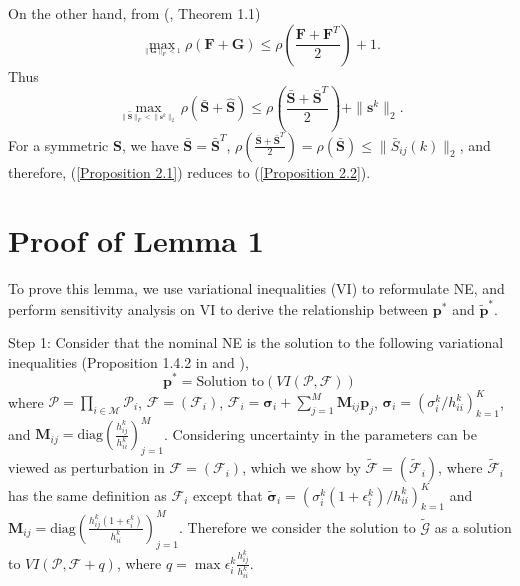 \documentclass[peerreview,onecolumn,11pt,draftclsnofoot]{IEEEtran}\usepackage{amsmath}\usepackage{amsfonts}\usepackage{epsfig}\usepackage{amssymb}\usepackage{graphicx}\usepackage{amssymb,amsmath}\usepackage{cite}\usepackage{color,soul}\newcommand\T{\rule{0pt}{3.1ex}}
\begin{document}
On the other hand, from (\!\!\cite{Matrixanalysis1}, Theorem 1.1)
\begin{equation}\label{6.Proof of Proposition 2}
 \max_{_{\|\textbf{G}\|_{F} < 1}} \rho (\textbf{F}+\textbf{G})\leq  \rho
 (\frac{\textbf{F}+\textbf{F}^{T}}{2})+1. \nonumber
\end{equation}
Thus
\begin{equation}\label{7.Proof of Proposition 2}
 \max_{_{\|\hat{\textbf{S}}\|_{F} < \|\mathbf{s}^{k}\|_2}} \rho (\bar{\textbf{S}}+\hat{\textbf{S}})\leq  \rho
 (\frac{\bar{\textbf{S}}+\bar{\textbf{S}}^{T}}{2})+\|\mathbf{s}^{k}\|_2. \nonumber
\end{equation}
For a symmetric $\textbf{S}$, we have $\bar{\textbf{S}}=\bar{\textbf{S}}^{T}$,
$\rho(\frac{\bar{\textbf{S}}+\bar{\textbf{S}}^{T}}{2})=\rho(\bar{\textbf{S}})\leq\|\bar{S}_{ij}(k)\|_{2}$,
and therefore, (\ref{Proposition 2.1}) reduces to (\ref{Proposition 2.2}).

\section{Proof of Lemma 1}
To prove this lemma, we use variational inequalities (VI) to reformulate NE, and perform sensitivity analysis on VI to derive the relationship between $\mathbf{p}^*$ and $\widetilde{\mathbf{p}}^*$.

Step 1: Consider that the nominal NE is the solution to the following variational inequalities (Proposition 1.4.2 in \cite{PangVI} and \cite{VIintroduction}),
\begin{equation}\label{RNEVI}
    \mathbf{p}^*= \text{Solution to}(VI(\mathcal{P}, \mathcal{F}))
\end{equation}
where $\mathcal{P}=\prod_{i \in \mathcal{M}}\mathcal{P}_i$, $\mathcal{F}=(\mathcal{F}_i)$, $\mathcal{F}_i= \boldsymbol{\sigma}_i+\sum_{j=1}^{M}\mathbf{M}_{ij}\mathbf{p}_{j}$, $\boldsymbol{\sigma}_i=(\sigma_{i}^{k}/h_{ii}^{k})_{k=1}^{K}$, and $\mathbf{M}_{ij}=\text{diag}(\frac{h_{ij}^{k}}{h_{ii}^{k}})_{j=1}^{M}$. Considering uncertainty in the parameters can be viewed as perturbation in $\mathcal{F}=(\mathcal{F}_i)$, which we show by $\widetilde{\mathcal{F}}=(\widetilde{\mathcal{F}}_i)$, where $\widetilde{\mathcal{F}}_i$ has the same definition as $\mathcal{F}_i$ except that $\widetilde{\boldsymbol{\sigma}}_i=(\sigma_{i}^{k}(1+\epsilon_{i}^{k})/h_{ii}^{k})_{k=1}^{K}$ and $\mathbf{M}_{ij}=\text{diag}(\frac{h_{ij}^{k}(1+\epsilon_{i}^{k})}{h_{ii}^{k}})_{j=1}^{M}$. Therefore we consider the solution to $\widetilde{\mathcal{G}}$ as a solution to $VI(\mathcal{P}, \mathcal{F}+q)$, where $q=\max \epsilon_{i}^{k}\frac{h_{ij}^{k}}{h_{ii}^{k}}$.
\end{document}
